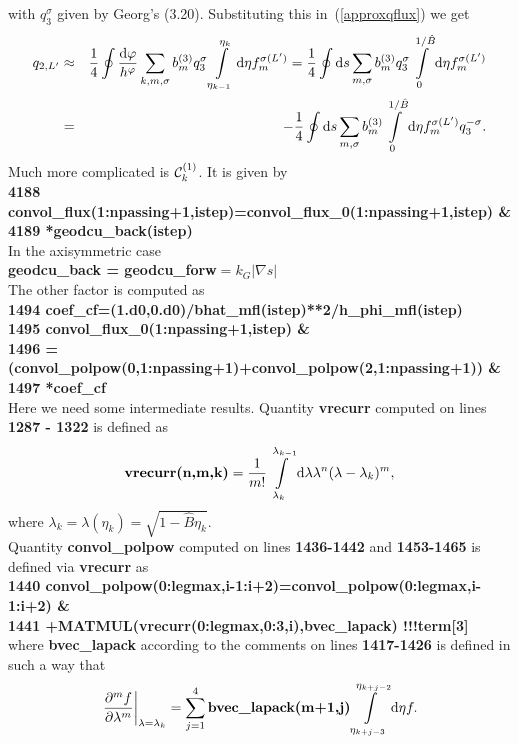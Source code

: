 \documentclass[preprint,prb,aps]{revtex4-1}
\newcommand{\bea}[1]{\begin{eqnarray} \label{#1}}
\newcommand{\eea}{\end{eqnarray}}
\newcommand{\eq}[1]{(\ref{#1})}
\newcommand{\difp}[2]{\frac{\partial #1}{\partial #2}}
\newcommand{\rd}{{\rm d}}
\begin{document}
with $q_3^\sigma$ given by Georg's (3.20). Substituting this in~\eq{approxqflux} we get
\bea{currents}
q_{2,L^\prime} &\approx& \frac{1}{4} \oint \frac{\rd \varphi}{h^\varphi} \sum_{k,m,\sigma} b^{(3)}_m q_3^\sigma
\int\limits_{\eta_{k-1}}^{\eta_k}\rd \eta f^{\sigma(L^\prime)}_m
= \frac{1}{4} \oint \rd s \sum_{m,\sigma} b^{(3)}_m q_3^\sigma
\int\limits_{0}^{1/\hat B}\rd \eta f^{\sigma(L^\prime)}_m
\nonumber \\
&=& -\frac{1}{4} \oint \rd s \sum_{m,\sigma} b^{(3)}_m
\int\limits_{0}^{1/\hat B}\rd \eta f^{\sigma(L^\prime)}_m q_3^{-\sigma}.
\eea
Much more complicated is ${\cal C}_k^{(1)}$. It is given by
\\
{\bf
4188       convol\_flux(1:npassing+1,istep)=convol\_flux\_0(1:npassing+1,istep) \& \\
4189                                      *geodcu\_back(istep)
}
\\
In the axisymmetric case
\\
{\bf geodcu\_back = geodcu\_forw}$ = k_G |\nabla s|$
\\
The other factor is computed as
\\
{\bf
1494     coef\_cf=(1.d0,0.d0)/bhat\_mfl(istep)**2/h\_phi\_mfl(istep) \\
1495     convol\_flux\_0(1:npassing+1,istep)                                        \& \\
1496            =(convol\_polpow(0,1:npassing+1)+convol\_polpow(2,1:npassing+1))    \&\\
1497            *coef\_cf
}
\\
Here we need some intermediate results. Quantity {\bf vrecurr} computed on lines {\bf 1287 - 1322} is defined as
$$
\mbox{\bf vrecurr(n,m,k)}
= \frac{1}{m!}\int\limits_{\lambda_k}^{\lambda_{k-1}}\rd\lambda \lambda^n (\lambda-\lambda_k)^m,
$$
where $\lambda_k=\lambda(\eta_k)=\sqrt{1-\hat B \eta_k}$.
\\
Quantity {\bf convol\_polpow} computed on lines {\bf 1436-1442} and {\bf 1453-1465} is defined via {\bf vrecurr}
as
\\
{\bf
1440         convol\_polpow(0:legmax,i-1:i+2)=convol\_polpow(0:legmax,i-1:i+2)      \& \\
1441                  +MATMUL(vrecurr(0:legmax,0:3,i),bvec\_lapack)       !!!term[3]
}
\\
where {\bf bvec\_lapack} according to the comments on lines {\bf 1417-1426} is defined in such a way that
$$
\left.\difp{^m f}{\lambda^m}\right|_{\lambda=\lambda_k}=\sum\limits_{j=1}^4
\mbox{\bf bvec\_lapack(m+1,j)}\int\limits_{\eta_{k+j-3}}^{\eta_{k+j-2}}\rd \eta f.
$$
\end{document}

